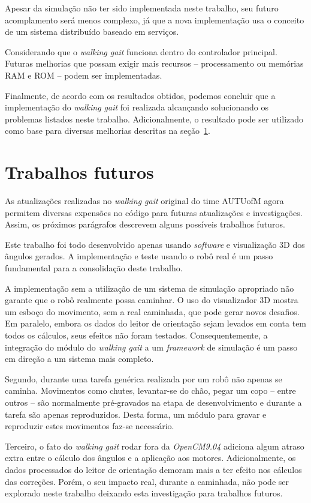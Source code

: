 Apesar da simulação não ter sido implementada neste trabalho, seu futuro acomplamento será menos complexo, já que a nova implementação usa o conceito de um sistema distribuído baseado em serviços.

Considerando que o \textit{walking gait} funciona dentro do controlador principal. Futuras melhorias que possam exigir mais recursos -- processamento ou memórias RAM e ROM -- podem ser implementadas.

Finalmente, de acordo com os resultados obtidos, podemos concluir que a implementação do \textit{walking gait} foi realizada alcançando solucionando os problemas listados neste trabalho. Adicionalmente, o resultado pode ser utilizado como base para diversas melhorias descritas na seção~\ref{sec:conclusion:future}.

\section{Trabalhos futuros}
\label{sec:conclusion:future}

As atualizações realizadas no \textit{walking gait} original do time AUTUofM agora permitem diversas expensões no código para futuras atualizações e investigações. Assim, os próximos parágrafos descrevem alguns possíveis trabalhos futuros.

Este trabalho foi todo desenvolvido apenas usando \textit{software} e visualização 3D dos ângulos gerados. A implementação e teste usando o robô real é um passo fundamental para a consolidação deste trabalho.

A implementação sem a utilização de um sistema de simulação apropriado não garante que o robô realmente possa caminhar. O uso do visualizador 3D mostra um esboço do movimento, sem a real caminhada, que pode gerar novos desafios. Em paralelo, embora os dados do leitor de orientação sejam levados em conta tem todos os cálculos, seus efeitos não foram testados. Consequentemente, a integração do módulo do \textit{walking gait} a um \textit{framework} de simulação é um passo em direção a um sistema mais completo.

Segundo, durante uma tarefa genérica realizada por um robô não apenas se caminha. Movimentos como chutes, levantar-se do chão, pegar um copo -- entre outros -- são normalmente pré-gravados na etapa de desenvolvimento e durante a tarefa são apenas reproduzidos. Desta forma, um módulo para gravar e reproduzir estes movimentos faz-se necessário.

Terceiro, o fato do \textit{walking gait} rodar fora da \textit{OpenCM9.04} adiciona algum atraso extra entre o cálculo dos ângulos e a aplicação aos motores. Adicionalmente, os dados processados do leitor de orientação demoram mais a ter efeito nos cálculos das correções. Porém, o seu impacto real, durante a caminhada, não pode ser explorado neste trabalho deixando esta investigação para trabalhos futuros.

